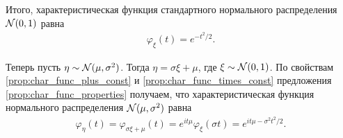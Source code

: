 \documentclass[../main.tex]{subfiles}
\begin{document}
\begin{exmpl}
   Итого, характеристическая функция стандартного нормального распределения $ \mathcal N(0,1) $ равна
   \begin{align*}
    \varphi_\xi(t) = e^{-t^{2} / 2}.
   \end{align*}

   Теперь пусть $ \eta \sim \mathcal N(\mu, \sigma^{2}) $. Тогда $ \eta = \sigma \xi + \mu $, где $ \xi \sim \mathcal N(0,1) $. По свойствам \ref{prop:char_func_plus_const} и \ref{prop:char_func_times_const} предложения \ref{prop:char_func_properties} получаем, что характеристическая функция нормального распределения $ \mathcal N(\mu,\sigma^{2}) $ равна
   \begin{align*}
    \varphi_\eta(t) = \varphi_{\sigma \xi + \mu}(t) = e^{it \mu} \varphi_\xi(\sigma t) = e^{it \mu - \sigma^{2}t^{2} / 2}.
   \end{align*}
\end{exmpl}
\end{document}
